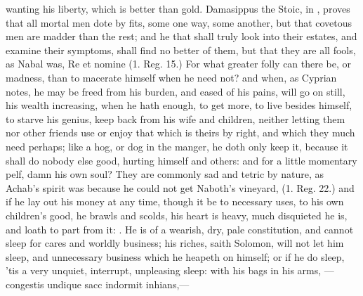 {wanting his liberty, which is better than gold. Damasippus the Stoic,
in \Horace{}, proves that all mortal men dote by fits, some one way, some
another, but that covetous men are madder than the rest; and he
that shall truly look into their estates, and examine their symptoms,
shall find no better of them, but that they are all fools, as
Nabal was, Re et nomine (1. Reg. 15.) For what greater folly can there
be, or  madness, than to macerate himself when he need not? and
when, as Cyprian notes, he may be freed from his burden, and
eased of his pains, will go on still, his wealth increasing, when he
hath enough, to get more, to live besides himself, to starve his
genius, keep back from his wife and children, neither letting
them nor other friends use or enjoy that which is theirs by right, and
which they much need perhaps; like a hog, or dog in the manger, he doth
only keep it, because it shall do nobody else good, hurting himself and
others: and for a little momentary pelf, damn his own soul? They are
commonly sad and tetric by nature, as Achab's spirit was because he
could not get Naboth's vineyard, (1. Reg. 22.) and if he lay out his
money at any time, though it be to necessary uses, to his own
children's good, he brawls and scolds, his heart is heavy, much
disquieted he is, and loath to part from it: . He is of a wearish, dry, pale constitution, and cannot sleep
for cares and worldly business; his riches, saith Solomon, will not let
him sleep, and unnecessary business which he heapeth on himself; or if
he do sleep, 'tis a very unquiet, interrupt, unpleasing sleep: with his
bags in his arms,
---congestis undique sacc
indormit inhians,---

}
